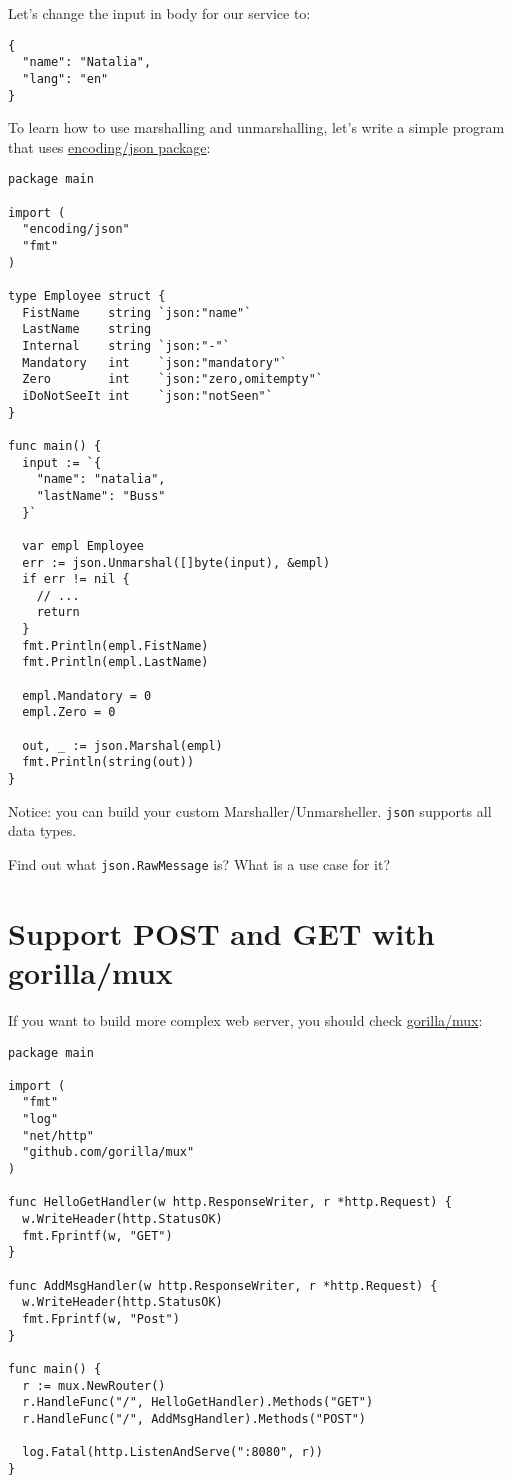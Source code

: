 \documentclass[11pt, letterpaper]{article}
\begin{document}
Let's change the input in body for our service to:

\begin{verbatim}
{
  "name": "Natalia",
  "lang": "en"
}
\end{verbatim}

To learn how to use marshalling and unmarshalling, let's write a simple program that uses \href{https://golang.org/pkg/encoding/json/}{encoding/json package}:

\begin{verbatim}
package main

import (
  "encoding/json"
  "fmt"
)

type Employee struct {
  FistName    string `json:"name"`
  LastName    string
  Internal    string `json:"-"`
  Mandatory   int    `json:"mandatory"`
  Zero        int    `json:"zero,omitempty"`
  iDoNotSeeIt int    `json:"notSeen"`
}

func main() {
  input := `{
    "name": "natalia",
    "lastName": "Buss"
  }`

  var empl Employee
  err := json.Unmarshal([]byte(input), &empl)
  if err != nil {
    // ...
    return
  }
  fmt.Println(empl.FistName)
  fmt.Println(empl.LastName)

  empl.Mandatory = 0
  empl.Zero = 0

  out, _ := json.Marshal(empl)
  fmt.Println(string(out))
}
\end{verbatim}

Notice: you can build your custom Marshaller/Unmarsheller. \verb|json| supports all data types.

\bigskip

Find out what \verb|json.RawMessage| is? What is a use case for it?

\section{Support POST and GET with gorilla/mux}

If you want to build more complex web server, you should check \href{https://github.com/gorilla/mux}{gorilla/mux}:

\begin{verbatim}
package main

import (
  "fmt"
  "log"
  "net/http"
  "github.com/gorilla/mux"
)

func HelloGetHandler(w http.ResponseWriter, r *http.Request) {
  w.WriteHeader(http.StatusOK)
  fmt.Fprintf(w, "GET")
}

func AddMsgHandler(w http.ResponseWriter, r *http.Request) {
  w.WriteHeader(http.StatusOK)
  fmt.Fprintf(w, "Post")
}

func main() {
  r := mux.NewRouter()
  r.HandleFunc("/", HelloGetHandler).Methods("GET")
  r.HandleFunc("/", AddMsgHandler).Methods("POST")

  log.Fatal(http.ListenAndServe(":8080", r))
}
\end{verbatim}
\end{document}
